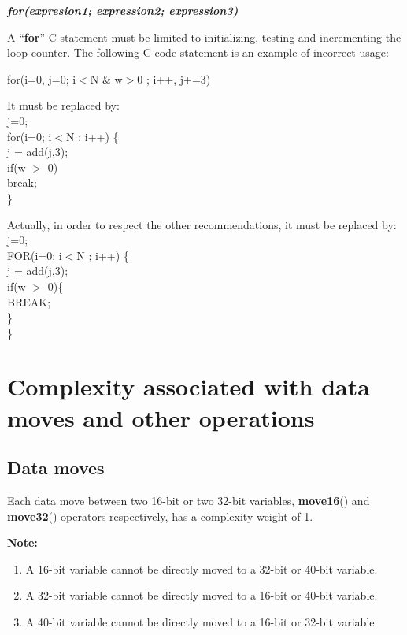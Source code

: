 \textbf{\emph{for(expresion1; expression2; expression3)}}

A ``\textbf{for}'' C statement must be limited to initializing,
testing and incrementing the loop counter. The following C code
statement is an example of incorrect usage:

for(i=0, j=0; i$<$N \& w$>$0 ; i++, j+=3)

It must be replaced by: \\
j=0;\\
for(i=0; i$<$N ; i++) \{\\
j = add(j,3);\\
if(w $>$ 0)\\
break; \\
\}

Actually, in order to respect the other recommendations, it must
be replaced by: \\
j=0;\\
FOR(i=0; i$<$N ; i++) \{\\
j = add(j,3);\\
if(w $>$ 0)\{\\
BREAK; \\
\}\\
\}


\section{Complexity associated with data moves and other operations}

\subsection{Data moves}

Each data move between two 16-bit or two 32-bit variables, \textbf{move16}() and \textbf{move32}() operators respectively, has a complexity weight of 1.

\textbf{Note:} \hfill {}

\begin{enumerate}{}{}
\item A 16-bit variable cannot be directly moved to a 32-bit or 40-bit variable.
\item A 32-bit variable cannot be directly moved to a 16-bit or 40-bit variable.
\item A 40-bit variable cannot be directly moved to a 16-bit or 32-bit variable.
\end{enumerate}

